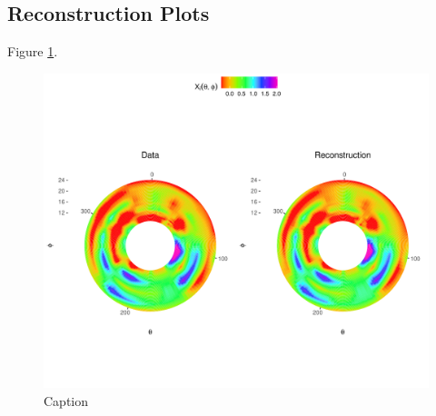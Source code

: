 \subsection{Reconstruction Plots}

Figure \ref{fig:eye-reconstruction}.

\begin{figure}
    \centering
    \includegraphics[width=0.75\linewidth]{figures/eye-reconstruction.pdf}
    \caption{Caption}
    \label{fig:eye-reconstruction}
\end{figure}